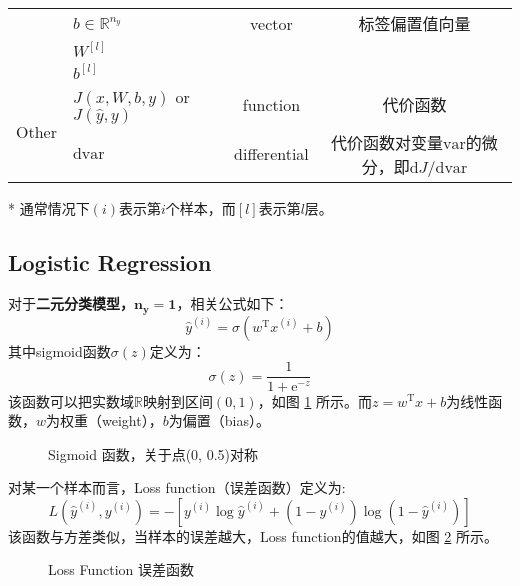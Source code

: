 \begin{table}[h]
\begin{threeparttable}
\begin{tabular}{clcc}
									& $b \in \mathbb{R}^{n_y}$                  & vector               & 标签偏置值向量                                                        \\
									& $W^{[l]}$                                 &                      &                                                                    \\
									& $b^{[l]}$                                 &                      &                                                                    \\ \hline
		\multirow{2}{*}{Other}      & $J(x,W,b,y)$ or $J(\hat{y},y)$            & function             & 代价函数                                                               \\
									& $\mathrm{d}\mathrm{var}$                  & differential         & 代价函数对变量$\mathrm{var}$的微分，即${\mathrm{d}J}/{\mathrm{d}\mathrm{var}}$ \\ \hline
	\end{tabular}
	\label{tab:notations} %
	\begin{tablenotes}
		\item[*] 通常情况下$(i)$表示第$i$个样本，而$[l]$表示第$l$层。
	\end{tablenotes}
	\end{threeparttable}
\end{table}

\subsection{Logistic Regression}

对于\textbf{二元分类模型，$\bm{n_y=1}$}，相关公式如下：
\begin{equation}
	\hat{y}^{(i)} = \sigma(w^\mathrm{T} x^{(i)} + b) \label{eq:logistic}
\end{equation}
其中sigmoid函数$\sigma(z)$定义为：
\begin{equation}
	\sigma(z) = \frac{1}{1 + \mathrm{e}^{-z}} \label{eq:sigmoid}
\end{equation}
该函数可以把实数域$\mathbb{R}$映射到区间$(0, 1)$，如图 \ref{fig:sigmoid} 所示。而$z = w^\mathrm{T} x + b$为线性函数，$w$为权重（weight），$b$为偏置（bias）。
\begin{figure}[h]
	\centering
	
	\caption{Sigmoid 函数，关于点(0, 0.5)对称}
	\label{fig:sigmoid}
\end{figure}

\vspace{0.5\baselineskip}
对某一个样本而言，Loss function（误差函数）定义为:
\begin{equation}
	L(\hat{y}^{(i)}, y^{(i)}) = -\left[y^{(i)} \log \hat{y}^{(i)} + (1 - y^{(i)}) \log (1 - \hat{y}^{(i)})\right] \label{eq:loss}
\end{equation}
该函数与方差类似，当样本的误差越大，Loss function的值越大，如图 \ref{fig:loss} 所示。
\begin{figure}[h]
	\centering
	
	\caption{Loss Function 误差函数}
	\label{fig:loss}
\end{figure}

